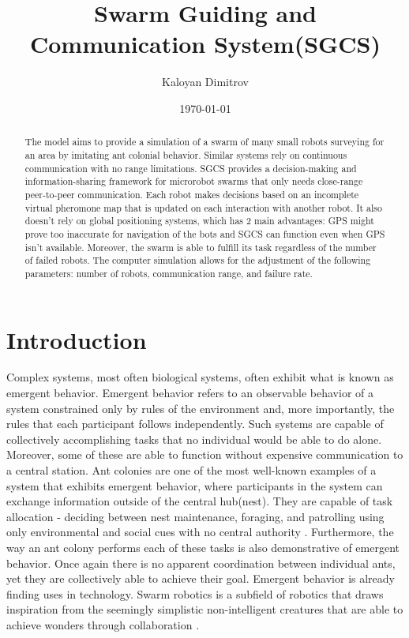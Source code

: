 \documentclass[12pt]{article}
\author{Kaloyan Dimitrov}
\title{Swarm Guiding and Communication System(SGCS)}
\date{\today}
\begin{document}
\maketitle
\begin{abstract}
The model aims to provide a simulation of a swarm of many small robots surveying for an area by imitating ant colonial behavior. Similar systems rely on continuous communication with no range limitations. SGCS provides a decision-making and information-sharing framework for microrobot swarms that only needs close-range peer-to-peer communication. Each robot makes decisions based on an incomplete virtual pheromone map that is updated on each interaction with another robot. It also doesn’t rely on global positioning systems, which has 2 main advantages: GPS might prove too inaccurate for navigation of the bots and SGCS can function even when GPS isn’t available. Moreover, the swarm is able to fulfill its task regardless of the number of failed robots. The computer simulation allows for the adjustment of the following parameters: number of robots, communication range, and failure rate.
\end{abstract}
\section{Introduction}
Complex systems, most often biological systems, often exhibit what is known as emergent behavior. Emergent behavior refers to an observable behavior of a system constrained only by rules of the environment and, more importantly, the rules that each participant follows independently. Such systems are capable of collectively accomplishing tasks that no individual would be able to do alone. Moreover, some of these are able to function without expensive communication to a central station. Ant colonies are one of the most well-known examples of a system that exhibits emergent behavior, where participants in the system can exchange information outside of the central hub(nest). They are capable of task allocation - deciding between nest maintenance, foraging, and patrolling using only environmental and social cues with no central authority \parencite{gordon_organization_1996}. Furthermore, the way an ant colony performs each of these tasks is also demonstrative of emergent behavior. Once again there is no apparent coordination between individual ants, yet they are collectively able to achieve their goal.
Emergent behavior is already finding uses in technology. Swarm robotics is a subfield of robotics that draws inspiration from the seemingly simplistic non-intelligent creatures that are able to achieve wonders through collaboration \parencite{schranz_swarm_2020}.
\end{document}
